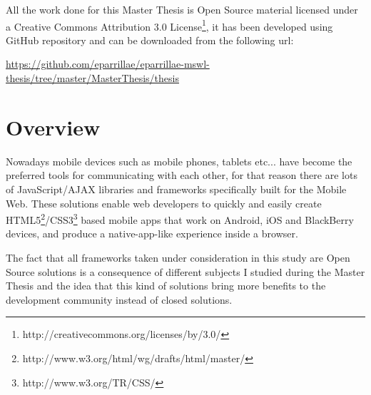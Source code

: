 \documentclass[a4paper,12pt]{book}
\begin{document}
All the work done for this Master Thesis is Open Source material licensed under a Creative Commons Attribution 3.0 License\footnote{http://creativecommons.org/licenses/by/3.0/}, it has been developed using GitHub repository and can be downloaded from the following url:

\url{
https://github.com/eparrillae/eparrillae-mswl-thesis/tree/master/MasterThesis/thesis}



\chapter{Overview}
\label{chap:overview}

Nowadays mobile devices such as mobile phones, tablets etc... have become the preferred tools for communicating with each other, for that reason there are lots of JavaScript/AJAX libraries and frameworks specifically built for the Mobile Web. 
These solutions enable web developers to quickly and easily create HTML5\footnote{http://www.w3.org/html/wg/drafts/html/master/}/CSS3\footnote{http://www.w3.org/TR/CSS/} based mobile apps that work on Android, iOS and BlackBerry devices, and produce a native-app-like experience inside a browser.









The fact that all frameworks taken under consideration in this study are Open Source solutions is a consequence of different subjects I studied during the Master Thesis and the idea that this kind of solutions bring more benefits to the development community instead of closed solutions.



\end{document}
